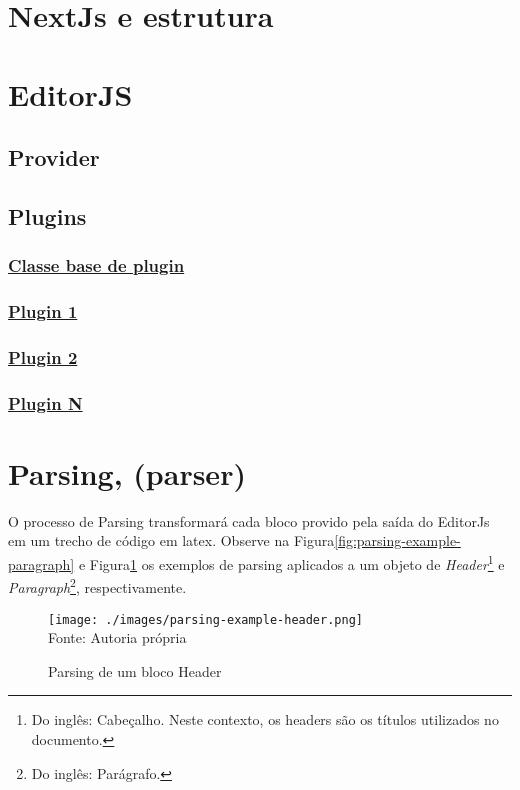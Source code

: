 \section{NextJs e estrutura}

\section{EditorJS}

\subsection{Provider}

\subsection{Plugins}

\subsubsection{\underline{Classe base de plugin}}

\subsubsection{\underline{Plugin 1}}

\subsubsection{\underline{Plugin 2}}

\subsubsection{\underline{Plugin N}}

\section{Parsing, (parser)}

O processo de Parsing transformará cada bloco provido
pela saída do EditorJs em um trecho de código em
\acrshort{latex}.
Observe na
Figura\ref{fig:parsing-example-paragraph}
e
Figura\ref{fig:parsing-example-header}
os exemplos de parsing aplicados a um objeto de
\textit{Header}\footnote{Do inglês: Cabeçalho. Neste contexto, os headers são os títulos utilizados no documento.
}
e
\textit{Paragraph}\footnote{Do inglês: Parágrafo.
},
respectivamente.

\begin{figure}[H]
    \centering
    \caption{Parsing de um bloco Header}
    \texttt{[image: ./images/parsing-example-header.png]}
    \label{fig:parsing-example-header} \\
    \textnormal{\fontsize{10pt}{12pt}Fonte: Autoria própria}
\end{figure}

